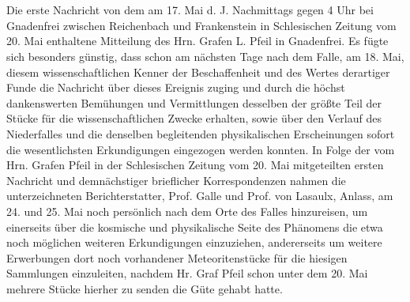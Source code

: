 \documentclass[a4paper, 11pt, oneside]{article}
\begin{document}
\section{}
\paragraph{}
Die erste Nachricht von dem am 17. Mai d. J. Nachmittags gegen 4 Uhr bei Gnadenfrei zwischen Reichenbach und Frankenstein in Schlesischen Zeitung vom 20. Mai enthaltene Mitteilung des Hrn. Grafen L. Pfeil in Gnadenfrei. Es fügte sich besonders günstig, dass schon am nächsten Tage nach dem Falle, am 18. Mai, diesem wissenschaftlichen Kenner der Beschaffenheit und des Wertes derartiger Funde die Nachricht über dieses Ereignis zuging und durch die höchst dankenswerten Bemühungen und Vermittlungen desselben der größte Teil der Stücke für die wissenschaftlichen Zwecke erhalten, sowie über den Verlauf des Niederfalles und die denselben begleitenden physikalischen Erscheinungen sofort die wesentlichsten Erkundigungen eingezogen werden konnten. In Folge der vom Hrn. Grafen Pfeil in der Schlesischen Zeitung vom 20. Mai mitgeteilten ersten Nachricht und demnächstiger brieflicher Korrespondenzen nahmen die unterzeichneten Berichterstatter, Prof. Galle und Prof. von Lasaulx, Anlass, am 24. und 25. Mai noch persönlich nach dem Orte des Falles hinzureisen, um einerseits über die kosmische und physikalische Seite des Phänomens die etwa noch möglichen weiteren Erkundigungen einzuziehen, andererseits um weitere Erwerbungen dort noch vorhandener Meteoritenstücke für die hiesigen Sammlungen einzuleiten, nachdem Hr. Graf Pfeil schon unter dem 20. Mai mehrere Stücke hierher zu senden die Güte gehabt hatte.
\end{document}
